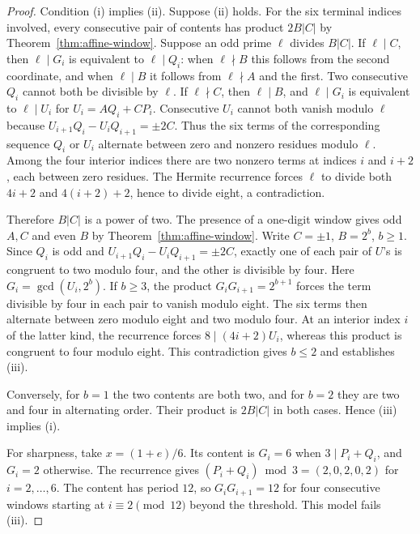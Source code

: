 \documentclass[11pt]{amsart}
\theoremstyle{definition}
\theoremstyle{remark}
\numberwithin{equation}{section}
\begin{document}
\begin{proof}
Condition (i) implies (ii). Suppose (ii) holds. For the six
terminal indices involved, every consecutive pair of contents
has product $2B|C|$ by Theorem~\ref{thm:affine-window}.
Suppose an odd prime $\ell$ divides $B|C|$. If $\ell\mid C$,
then $\ell\mid G_i$ is equivalent to $\ell\mid Q_i$:
when $\ell\nmid B$ this follows from the second coordinate, and
when $\ell\mid B$ it follows from $\ell\nmid A$ and the first.
Two consecutive $Q_i$ cannot both be divisible by $\ell$.
If $\ell\nmid C$, then $\ell\mid B$, and
$\ell\mid G_i$ is equivalent to $\ell\mid U_i$ for
$U_i=AQ_i+CP_i$. Consecutive $U_i$ cannot both vanish modulo $\ell$
because $U_{i+1}Q_i-U_iQ_{i+1}=\pm2C$.
Thus the six terms of the corresponding sequence $Q_i$ or $U_i$
alternate between zero and nonzero residues modulo $\ell$.
Among the four interior indices there are two nonzero terms
at indices $i$ and $i+2$, each between zero residues.
The Hermite recurrence forces $\ell$ to divide both $4i+2$
and $4(i+2)+2$, hence to divide eight, a contradiction.

Therefore $B|C|$ is a power of two. The presence of a one-digit
window gives odd $A,C$ and even $B$ by
Theorem~\ref{thm:affine-window}. Write $C=\pm1$, $B=2^b$, $b\ge1$.
Since $Q_i$ is odd and $U_{i+1}Q_i-U_iQ_{i+1}=\pm2C$, exactly one
of each pair of $U$'s is congruent to two modulo four, and the other
is divisible by four. Here $G_i=\gcd(U_i,2^b)$.
If $b\ge3$, the product $G_iG_{i+1}=2^{b+1}$ forces the term
divisible by four in each pair to vanish modulo eight.
The six terms then alternate between zero modulo eight and
two modulo four. At an interior index $i$ of the latter kind,
the recurrence forces $8\mid(4i+2)U_i$, whereas this product
is congruent to four modulo eight. This contradiction gives $b\le2$
and establishes (iii).

Conversely, for $b=1$ the two contents are both two, and for $b=2$
they are two and four in alternating order. Their product is
$2B|C|$ in both cases. Hence (iii) implies (i).

For sharpness, take $x=(1+e)/6$. Its content is $G_i=6$ when
$3\mid P_i+Q_i$, and $G_i=2$ otherwise. The recurrence gives
$(P_i+Q_i)\bmod3=(2,0,2,0,2)$ for $i=2,\ldots,6$.
The content has period $12$, so $G_iG_{i+1}=12$ for four
consecutive windows starting at $i\equiv2\pmod{12}$ beyond the
threshold. This model fails (iii).
\end{proof}
\end{document}
